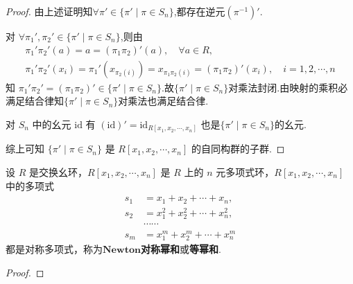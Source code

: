 \documentclass[../../main.tex]{subfiles}%
\begin{document}
\begin{proof}
由上述证明知$\forall \pi'\in \{\pi' \mid \pi \in S_n\}$,都存在逆元$(\pi^{-1})'$.

对 \(\forall \pi_1', \pi_2' \in \{\pi' \mid \pi \in S_n\} \),则由
\begin{gather*}
\pi_1'\pi_2'(a) = a=(\pi_1\pi_2)'(a), \quad \forall a \in R, \\
\pi_1'\pi_2'(x_i) = \pi_1'(x_{\pi_2(i)}) = x_{\pi_1\pi_2(i)}=(\pi_1\pi_2)'(x_i), \quad i = 1, 2, \cdots, n
\end{gather*}
知 \( \pi_1'\pi_2'=(\pi_1\pi_2)'\in \{\pi' \mid \pi \in S_n\} \).故$\{\pi' \mid \pi \in S_n\}$对乘法封闭.由映射的乘积必满足结合律知$\{\pi' \mid \pi \in S_n\}$对乘法也满足结合律.

对 \( S_n \) 中的幺元 \( \text{id} \) 有
$(\text{id})' = \text{id}_{R[x_1, x_2, \cdots, x_n]}$
也是$\{\pi' \mid \pi \in S_n\}$的幺元.

综上可知 \( \{\pi' \mid \pi \in S_n\} \) 是 \( R[x_1, x_2, \cdots, x_n] \) 的自同构群的子群.
\end{proof}

\begin{lemma}
设 \( R \) 是交换幺环，\( R[x_1, x_2, \cdots, x_n] \) 是 \( R \) 上的 \( n \) 元多项式环，\( R[x_1, x_2, \cdots, x_n] \) 中的多项式
\begin{align*}
s_1 &= x_1 + x_2 + \cdots + x_n, \\
s_2 &= x_1^2 + x_2^2 + \cdots + x_n^2, \\
&\cdots\cdots \\
s_m &= x_1^m + x_2^m + \cdots + x_n^m
\end{align*}
都是对称多项式，称为$\mathbf{Newton}$\textbf{对称幂和}或\textbf{等幂和}.
\end{lemma}
\begin{proof}

\end{proof}
\end{document}
